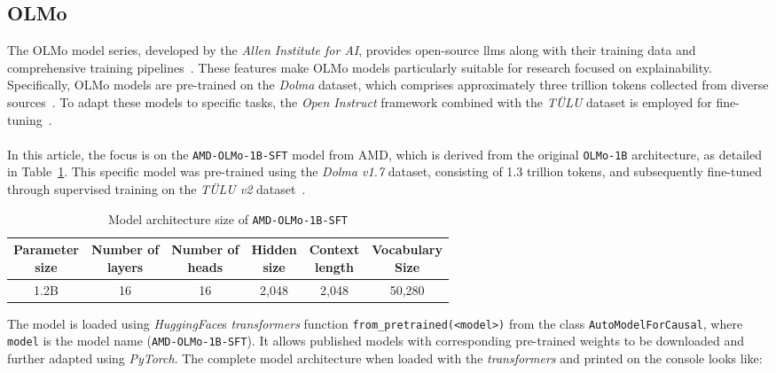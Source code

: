 \subsection{OLMo}
The OLMo model series, developed by the \emph{Allen Institute for AI}, provides open-source \acrshort{llm}s along with their training data and comprehensive training pipelines~\cite{Groeneveld2023OLMo}. These features make OLMo models particularly suitable for research focused on explainability. Specifically, OLMo models are pre-trained on the \emph{Dolma} dataset, which comprises approximately three trillion tokens collected from diverse sources~\cite{dolma}. To adapt these models to specific tasks, the \emph{Open Instruct} framework combined with the \emph{TÜLU} dataset is employed for fine-tuning~\cite{ivison2023camels}.
\\\\
In this article, the focus is on the \texttt{AMD-OLMo-1B-SFT} model from AMD, which is derived from the original \texttt{OLMo-1B} architecture, as detailed in Table~\ref{tab:model_architecture_olmo_1b_amd}. This specific model was pre-trained using the \emph{Dolma v1.7} dataset, consisting of 1.3 trillion tokens, and subsequently fine-tuned through supervised training on the \emph{TÜLU v2} dataset~\cite{AMD-OLMo}.
\begin{table}[htb]
    \centering
    \begin{tabular}{|c|c|c|c|c|c|}
        \hline  
        \BreakHeader{Parameter \\ size} & \BreakHeader{Number of \\ layers} & \BreakHeader{Number of \\ heads} & \BreakHeader{Hidden \\ size} & \BreakHeader{Context \\ length} & \BreakHeader{Vocabulary \\ Size} \\ 
        \hline  
        1.2B & 16 & 16 & 2{,}048 & 2{,}048 & 50{,}280 \\
        \hline
    \end{tabular}
    \caption{Model architecture size of \texttt{AMD-OLMo-1B-SFT} \cite{AMD-OLMo}}
    \label{tab:model_architecture_olmo_1b_amd}
\end{table} 
The model is loaded using \emph{HuggingFace}\textquotesingle s \emph{transformers} function \texttt{from\_pretrained(\textless model\textgreater)} from the class \texttt{AutoModelForCausal}, where \texttt{model} is the model name (\texttt{AMD-OLMo-1B-SFT}). It allows published models with corresponding pre-trained weights to be downloaded and further adapted using \emph{PyTorch}. The complete model architecture when loaded with the \emph{transformers} and printed on the console looks like:
